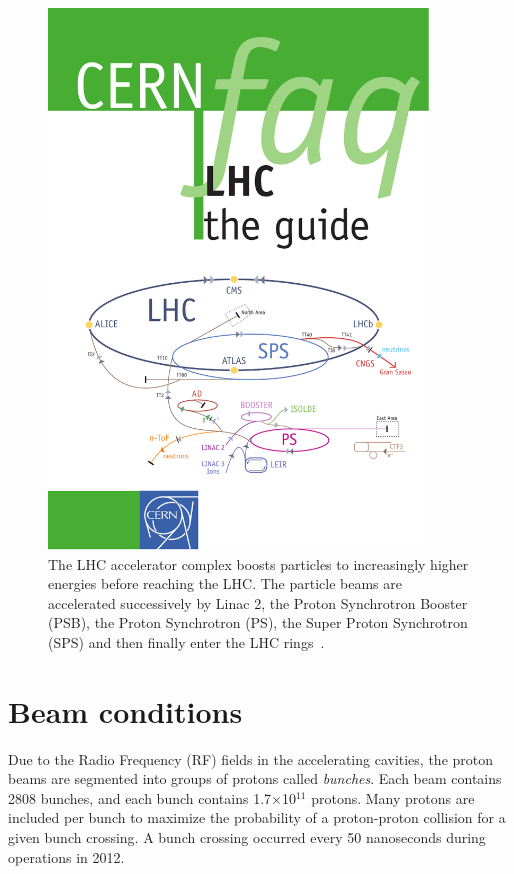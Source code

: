 \begin{figure}[tp]
  \centering
  \includegraphics[width=0.90\textwidth]{fig/atlas/accel-chain.pdf}
  \caption{The LHC accelerator complex boosts particles to increasingly higher energies before reaching the LHC. The particle beams are accelerated successively by Linac 2, the Proton Synchrotron Booster (PSB), the Proton Synchrotron (PS), the Super Proton Synchrotron (SPS) and then finally enter the LHC rings~\cite{cern-faq}.}
  \label{fig:lhc-chain}
\end{figure}
\section{Beam conditions}
Due to the Radio Frequency (RF) fields in the accelerating cavities, the proton beams are segmented into groups of protons called \textit{bunches}. Each beam contains 2808 bunches, and each bunch contains 1.7$\times$10$^{11}$ protons. Many protons are included per bunch to maximize the probability of a proton-proton collision for a given bunch crossing. A bunch crossing occurred every 50 nanoseconds during operations in 2012.

